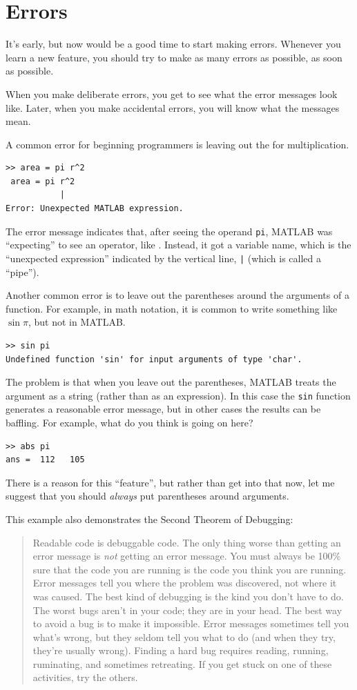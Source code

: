 \documentclass[
]{book}
\newcommand{\displaythrm}[1]{%
    \ifthenelse{\equal{#1}{1}}%
        {Readable code is debuggable code.}{%
    \ifthenelse{\equal{#1}{2}}%
        {The only thing worse than getting an error message is {\em
         not} getting an error message.}{%
    \ifthenelse{\equal{#1}{3}}%
        {You must always be 100\% sure that the code you are running
         is the code you think you are running.}{%
    \ifthenelse{\equal{#1}{4}}%
        {Error messages tell you where the problem was discovered,
         not where it was caused.}{%
    \ifthenelse{\equal{#1}{5}}%
        {The best kind of debugging is the kind you don't have to do.}{%
    \ifthenelse{\equal{#1}{6}}%
        {The worst bugs aren't in your code; they are in your head.}{%
    \ifthenelse{\equal{#1}{7}}%
        {The best way to avoid a bug is to make it impossible.}{%
    \ifthenelse{\equal{#1}{8}}%
        {Error messages sometimes tell you what's wrong, but they
         seldom tell you what to do (and when they try, they're usually
         wrong).}{%
    \ifthenelse{\equal{#1}{9}}%
        {Finding a hard bug requires reading, running, ruminating,
         and sometimes retreating.  If you get stuck on one of these
         activities, try the others.}{%
    {}%
}}}}}}}}}}%
\begin{document}
\section{Errors}

It's early, but now would be a good time to start making errors.
Whenever you learn a new feature, you should try
to make as many errors as possible, as soon as possible.

When you make deliberate errors, you get to see what the error messages
look like.  Later, when you make accidental errors, you will know what
the messages mean.

A common error for beginning programmers is leaving out the {\tt *}
for multiplication.

\begin{verbatim}
>> area = pi r^2
 area = pi r^2
           |
Error: Unexpected MATLAB expression.
\end{verbatim}

The error message indicates that, after seeing the operand {\tt pi},
MATLAB was ``expecting'' to see an operator, like {\tt *}.  Instead,
it got a variable name, which is the ``unexpected expression'' indicated
by the vertical line, {\tt |} (which is called a ``pipe'').

Another common error is to leave out the parentheses around the
arguments of a function.  For example, in math notation, it is common
to write something like $\sin \pi$, but not in MATLAB.

\begin{verbatim}
>> sin pi
Undefined function 'sin' for input arguments of type 'char'.
\end{verbatim}

The problem is that when you leave out the parentheses, MATLAB treats
the argument as a string (rather than as an expression).  In
this case the {\tt sin} function generates a reasonable error message,
but in other cases the results can be baffling.  For example, what
do you think is going on here?

\begin{verbatim}
>> abs pi
ans =  112   105
\end{verbatim}

There is a reason for this ``feature'', but rather than get into that
now, let me suggest that you should {\em always} put parentheses around
arguments.

This example also demonstrates the Second Theorem of Debugging:

\begin{quote}
\displaythrm{2}
\end{quote}
\end{document}
